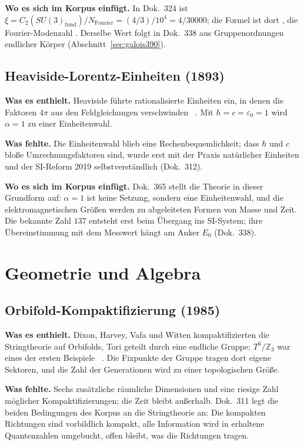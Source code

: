 \textbf{Wo es sich im Korpus einfügt.} In Dok.~324 ist $\xi=C_2(SU(3)_{\mathrm{fund}})/N_{\mathrm{Fourier}}
=(4/3)/10^4=4/30000$; die Formel ist dort \BM, die Fourier-Modenzahl \KM. Derselbe Wert folgt in
Dok.~338 aus Gruppenordnungen endlicher Körper (Abschnitt~\ref{sec:galois390}).

\subsection{Heaviside-Lorentz-Einheiten (1893)}

\textbf{Was es enthielt.} Heaviside führte rationalisierte Einheiten ein, in denen die Faktoren
$4\pi$ aus den Feldgleichungen verschwinden \QM~\cite{Heaviside1893}. Mit $\hbar=c=\varepsilon_0=1$
wird $\alpha=1$ zu einer Einheitenwahl.

\textbf{Was fehlte.} Die Einheitenwahl blieb eine Rechenbequemlichkeit; dass $\hbar$ und $c$ bloße
Umrechnungsfaktoren sind, wurde erst mit der Praxis natürlicher Einheiten und der SI-Reform 2019
selbstverständlich (Dok.~312).

\textbf{Wo es sich im Korpus einfügt.} Dok.~365 stellt die Theorie in dieser Grundform auf: $\alpha=1$
ist keine Setzung, sondern eine Einheitenwahl, und die elektromagnetischen Größen werden zu
abgeleiteten Formen von Masse und Zeit. Die bekannte Zahl $137$ entsteht erst beim Übergang ins
SI-System; ihre Übereinstimmung mit dem Messwert hängt am Anker $E_0$ (Dok.~338).

\section{Geometrie und Algebra}

\subsection{Orbifold-Kompaktifizierung (1985)}

\textbf{Was es enthielt.} Dixon, Harvey, Vafa und Witten kompaktifizierten die Stringtheorie auf
Orbifolds, Tori geteilt durch eine endliche Gruppe; $T^6/\mathbb{Z}_3$ war eines der ersten
Beispiele \QM~\cite{DHVW1985}. Die Fixpunkte der Gruppe tragen dort eigene Sektoren, und die
Zahl der Generationen wird zu einer topologischen Größe.

\textbf{Was fehlte.} Sechs zusätzliche räumliche Dimensionen und eine riesige Zahl möglicher
Kompaktifizierungen; die Zeit bleibt außerhalb. Dok.~311 legt die beiden Bedingungen des Korpus an
die Stringtheorie an: Die kompakten Richtungen sind vorbildlich kompakt, alle Information wird in
erhaltene Quantenzahlen umgebucht, offen bleibt, was die Richtungen tragen.

